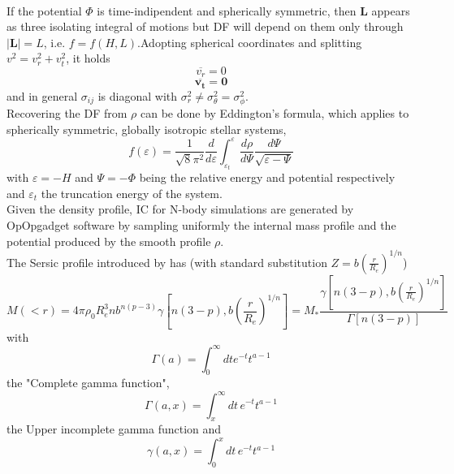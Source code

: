 \\If the potential $\Phi$ is time-indipendent and spherically symmetric, then $\mathbf{L}$ 
appears as three isolating integral of motions but DF will depend on them only through 
$|\mathbf{L}|=L$, i.e. $f=f(H,L)$.Adopting spherical coordinates and splitting 
$v^2=v_r^2+v_t^2$, it holds 
\begin{equation}
    \overline{v_r}=0
\end{equation}
\begin{equation}
    \overline{\mathbf{v_t}}=\mathbf{0}
\end{equation}
and in general $\sigma_{ij}$ is diagonal with $\sigma^2_r\ne \sigma^2_\theta=\sigma^2_\phi$.\\Recovering
the DF from $\rho$ can be done by Eddington's formula, which applies to spherically symmetric,
globally isotropic stellar systems,
\begin{equation}\label{Eddington's formula}
f(\varepsilon)=\frac{1}{\sqrt{8}\pi^2}\frac{d}{d\varepsilon}
\int_{\varepsilon_t}^{\varepsilon}
\frac{d\rho}{d\Psi}\frac{d\Psi}{\sqrt{\varepsilon-\Psi}}
\end{equation}
with $\varepsilon=-H$ and $\Psi=-\Phi$ being the relative energy and potential respectively
and $\varepsilon_t$ the truncation energy of the system.\\Given the density profile, IC for N-body
simulations are generated by OpOpgadget software by sampling uniformly the internal mass profile
and the potential produced by the smooth profile $\rho$.\\The Sersic profile introduced by 
\textcite{Prugniel} has (with standard substitution $Z=b\left(\frac{r}{R_e}\right)^{1/n}$)
\begin{equation}\label{Sersic mass profile}
    M(<r)=4\pi \rho_0 R_e^3 n b^{n(p-3)}\gamma\left[n(3-p),b\left(\frac{r}{R_e}\right)^
    {1/n}\right]=M_*\frac{\gamma\left[n(3-p),b\left(\frac{r}{R_e}\right)^
    {1/n}\right]}{\Gamma[n(3-p)]}
\end{equation}
with 
\begin{equation}\label{complete gamma fun}
    \Gamma(a)=\int_{0}^{\infty}dt e^{-t}t^{a-1}
\end{equation}
the "Complete gamma function", 
\begin{equation}\label{upper incomplete gamma fun}
    \Gamma(a,x)=\int_{x}^{\infty}dt\,e^{-t}t^{a-1}
\end{equation}
the Upper incomplete gamma function and
\begin{equation}\label{lower incomplete gamma fun}
    \gamma(a,x)=\int_{0}^{x}dt\,e^{-t}t^{a-1}
\end{equation}
